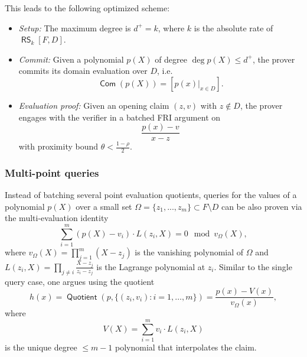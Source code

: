 \documentclass[11pt]{article}
\theoremstyle{definition}
\theoremstyle{remark}
\DeclareMathOperator{\comm}{\mathsf{Com}}
\DeclareMathOperator{\RS}{\mathsf{RS}}
\DeclareMathOperator{\Quotient}{\mathsf{Quotient}}
\begin{document}

This leads to the following optimized scheme:
\begin{itemize}
\item
\textit{Setup:} 
The maximum degree is $d^+ = k$, where $k$ is the absolute rate of $\RS_k[F,D]$.
\item
\textit{Commit:} 
Given a polynomial $p(X)$ of degree $\deg p(X)\leq d^+$, the prover commits its domain evaluation over $D$, i.e.
\[ 
\comm(p(X))=[p(x)|_{x\in D}].
\]

\item
\textit{Evaluation proof:} 
Given an opening claim $(z,v)$ with $z\notin D$, the prover engages with the verifier in a batched FRI argument on 
\[
\frac{p(x)-v}{x-z}
\]
with proximity bound $\theta < \frac{1-\rho}{2}$.
\end{itemize}


\subsubsection{Multi-point queries}
\label{s:MultiPoint}

Instead of batching several point evaluation quotients, queries for the values of a polynomial $p(X)$ over a small set 
$\Omega=\{z_1,...,z_m\}\subset F\setminus D$ can be also proven via the multi-evaluation identity 
\begin{equation}
\label{e:MultiEvalIdentity}
\sum_{i=1}^m (p(X) - v_i) \cdot L(z_i,X) = 0 \mod v_\Omega(X),
\end{equation}
where $v_\Omega(X)= \prod_{j=1}^m (X-z_j)$ is the vanishing polynomial of  $\Omega$ and $L(z_i,X)=\prod_{j\neq i} \frac{X-z_j}{z_i-z_j}$ is the Lagrange polynomial at $z_i$. 
Similar to the single query case, one argues using the quotient
\begin{equation}
\label{e:MultiPointQuotient}
h(x) = \Quotient(p, \{(z_i,v_i):i=1,\ldots,m\}) = \frac{p(x)-V(x)}{v_\Omega(x)},
\end{equation}
where 
\[
V(X)= \sum_{i=1}^m v_i\cdot L(z_i,X)
\] 
is the unique degree $\leq m-1$ polynomial that interpolates the claim. 
\end{document}
